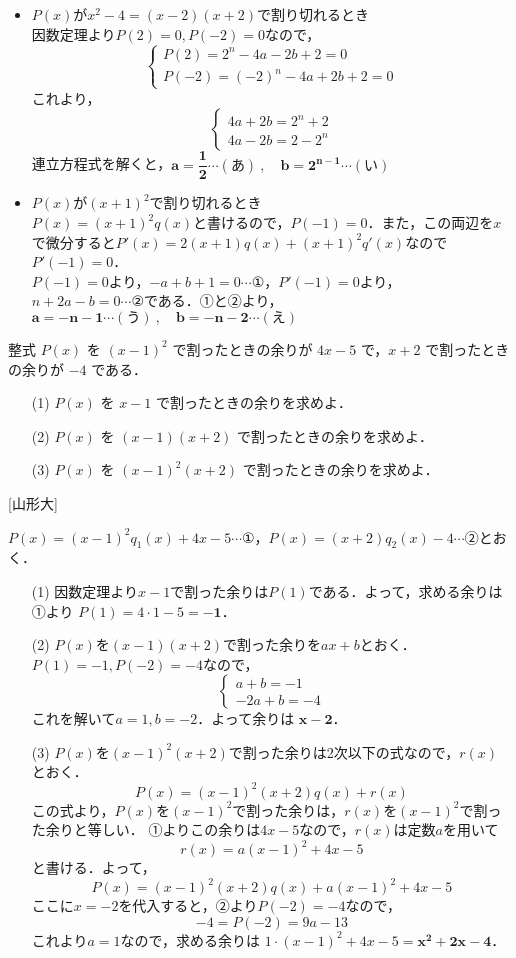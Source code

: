 \documentclass[a4paper,11pt]{ltjsarticle}
\begin{document}
\begin{itemize}
    \item $P(x)$が$x^2-4=(x-2)(x+2)$で割り切れるとき\\
    因数定理より$P(2)=0, P(-2)=0$なので，
    \[\begin{cases}
    P(2) = 2^n - 4a - 2b + 2 = 0\\
    P(-2) = (-2)^n - 4a + 2b + 2 =0
    \end{cases}\]
    これより，
        \[\begin{cases}
     4a+2b=2^n + 2 \\
    4a-2b=2-2^{n}
    \end{cases}\]
    連立方程式を解くと，$\boldsymbol{a = \dfrac12\cdots (あ)~, \quad b = 2^{n-1}\cdots (い)}$
    \item $P(x)$が$(x+1)^2$で割り切れるとき\\
    $P(x)=(x+1)^2q(x)$と書けるので，$P(-1)=0$．また，この両辺を$x$で微分すると$P'(x)=2(x+1)q(x)+(x+1)^2q'(x)$なので$ P'(-1)=0$．\\
    $P(-1)=0$より，$-a+b+1=0 \cdots ①$，$P'(-1)=0$より，$n+2a-b=0\cdots ②$である．①と②より， $\boldsymbol{a = -n-1\cdots (う)~, \quad b = -n-2\cdots (え)}$
\end{itemize}
\newpage
\begin{toi}
整式 $P(x)$ を $(x-1)^2$ で割ったときの余りが $4x-5$ で，$x+2$ で割ったときの余りが $-4$ である．
\begin{enumerate}
  \item[(1)] $P(x)$ を $x-1$ で割ったときの余りを求めよ．
  \item [(2)]$P(x)$ を $(x-1)(x+2)$ で割ったときの余りを求めよ．
  \item [(3)]$P(x)$ を $(x-1)^2(x+2)$ で割ったときの余りを求めよ．
\end{enumerate}
\hfill[山形大]
\end{toi}
\ans 
$P(x)=(x-1)^2q_1(x)+4x-5 \cdots$①，$P(x)=(x+2)q_2(x)-4 \cdots$②とおく．
\begin{enumerate}
  \item[(1)] 因数定理より$x-1$で割った余りは$P(1)$である．よって，求める余りは①より $P(1)=4\cdot1-5=\boldsymbol{-1}$．
  \item [(2)] $P(x)$を$(x-1)(x+2)$で割った余りを$ax+b$とおく．
  $P(1)=-1, P(-2)=-4$なので，
  \[\begin{cases}
  a+b=-1 \\ -2a+b=-4
  \end{cases}\]
  これを解いて$a=1, b=-2$．よって余りは $\boldsymbol{x-2}$．
  \item[(3)] $P(x)$を$(x-1)^2(x+2)$で割った余りは2次以下の式なので，$r(x)$とおく．
  \[P(x)=(x-1)^2(x+2)q(x)+r(x)\]
  この式より，$P(x)$を$(x-1)^2$で割った余りは，$r(x)$を$(x-1)^2$で割った余りと等しい．
  ①よりこの余りは$4x-5$なので，$r(x)$は定数$a$を用いて
  \[r(x)=a(x-1)^2+4x-5\]
  と書ける．よって，
  \[P(x)=(x-1)^2(x+2)q(x)+a(x-1)^2+4x-5\]
  ここに$x=-2$を代入すると，②より$P(-2)=-4$なので，
  \[-4=P(-2)=9a-13\]
これより$a=1$なので，求める余りは $1\cdot(x-1)^2+4x-5 =\boldsymbol{x^2+2x-4}$．
\end{enumerate}
\end{document}
